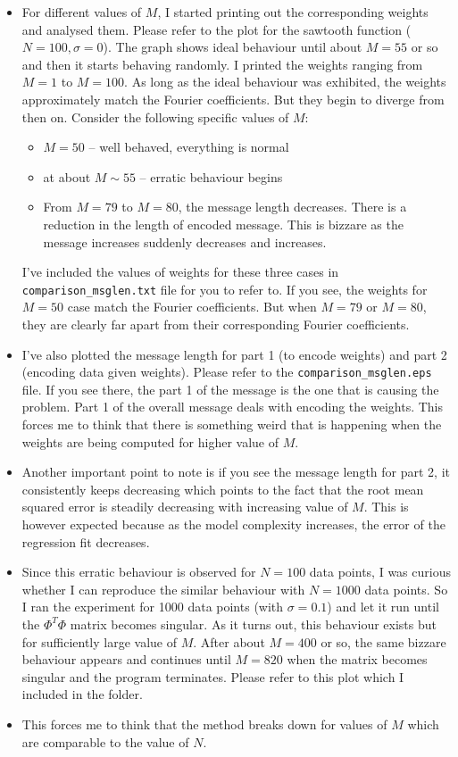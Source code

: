 \documentclass[a4paper,12pt]{article}
\begin{document}
\begin{itemize}
 \item 	For different values of $M$, I started printing out the corresponding weights and analysed them. Please refer to the plot for the sawtooth function ($N=100, \sigma=0$). The graph shows ideal behaviour until about $M=55$ or so and then it starts behaving randomly. I printed the weights ranging from $M=1$ to $M=100$. As long as the ideal behaviour was exhibited, the weights approximately match the Fourier coefficients. But they begin to diverge from then on. Consider the following specific values of $M$:
    \begin{itemize}
     \item $M=50$ -- well behaved, everything is normal
     \item at about $M \sim 55$ -- erratic behaviour begins
     \item From $M=79$ to $M=80$, the message length decreases. There is a reduction in the length of encoded message. This is bizzare as the message increases suddenly decreases and increases.
    \end{itemize}
    
I've included the values of weights for these three cases in \texttt{comparison\_msglen.txt} file for you to refer to. If you see, the weights for $M=50$ case match the Fourier coefficients. But when $M=79$ or $M=80$, they are clearly far apart from their corresponding Fourier coefficients.

 \item I've also plotted the message length for part 1 (to encode weights) and part 2 (encoding data given weights). Please refer to the \texttt{comparison\_msglen.eps} file. If you see there, the part 1 of the message is the one that is causing the problem. Part 1 of the overall message deals with encoding the weights. This forces me to think that there is something weird that is happening when the weights are being computed for higher value of $M$.
 
 \item Another important point to note is if you see the message length for part 2, it consistently keeps decreasing which points to the fact that the root mean squared error is steadily decreasing with increasing value of $M$. This is however expected because as the model complexity increases, the error of the regression fit decreases.
 
 \item Since this erratic behaviour is observed for $N = 100$ data points, I was curious whether I can reproduce the similar behaviour with $N = 1000$ data points. So I ran the experiment for 1000 data points (with $\sigma = 0.1$) and let it run until the $\Phi^T\Phi$ matrix becomes singular. As it turns out, this behaviour exists but for sufficiently large value of $M$. After about $M = 400$ or so, the same bizzare behaviour appears and continues until $M=820$ when the matrix becomes singular and the program terminates. Please refer to this plot which I included in the folder.
 
 \item This forces me to think that the method breaks down for values of $M$ which are comparable to the value of $N$.
\end{itemize}
\end{document}
